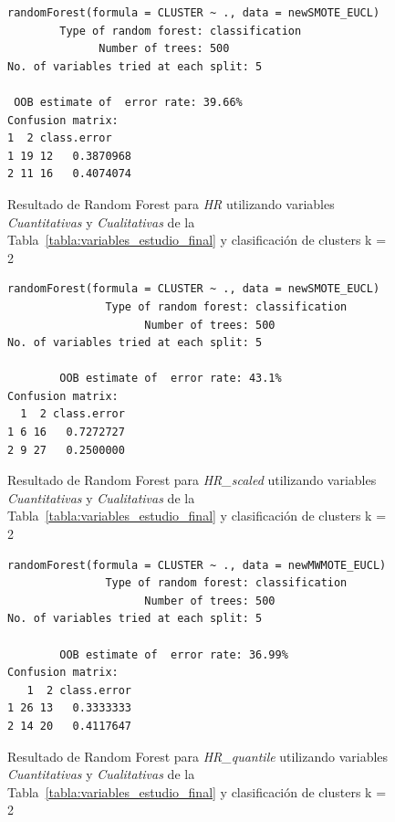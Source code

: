 \begin{figure}[H]
    \centering
    \begin{lstlisting}[frame=single, basicstyle=\small\ttfamily]
        randomForest(formula = CLUSTER ~ ., data = newSMOTE_EUCL) 
        Type of random forest: classification
              Number of trees: 500
No. of variables tried at each split: 5

 OOB estimate of  error rate: 39.66%
Confusion matrix:
1  2 class.error
1 19 12   0.3870968
2 11 16   0.4074074
    \end{lstlisting}
    \caption{Resultado de Random Forest para \textit{HR} utilizando variables \textit{Cuantitativas} y \textit{Cualitativas} de la Tabla~\ref{tabla:variables_estudio_final} y clasificación de clusters k = 2}\label{fig:random_forest_eucl_result_1}
\end{figure}
\begin{figure}[H]
    \centering
    \begin{lstlisting}[frame=single, basicstyle=\small\ttfamily]
        randomForest(formula = CLUSTER ~ ., data = newSMOTE_EUCL) 
               Type of random forest: classification
                     Number of trees: 500
No. of variables tried at each split: 5

        OOB estimate of  error rate: 43.1%
Confusion matrix:
  1  2 class.error
1 6 16   0.7272727
2 9 27   0.2500000
    \end{lstlisting}
    \caption{Resultado de Random Forest para \textit{HR\_scaled} utilizando variables \textit{Cuantitativas} y \textit{Cualitativas} de la Tabla~\ref{tabla:variables_estudio_final} y clasificación de clusters k = 2}
    \label{fig:random_forest_eucl_result_2}
\end{figure}

\begin{figure}[H]
    \centering
    \begin{lstlisting}[frame=single, basicstyle=\small\ttfamily]
        randomForest(formula = CLUSTER ~ ., data = newMWMOTE_EUCL) 
               Type of random forest: classification
                     Number of trees: 500
No. of variables tried at each split: 5

        OOB estimate of  error rate: 36.99%
Confusion matrix:
   1  2 class.error
1 26 13   0.3333333
2 14 20   0.4117647
    \end{lstlisting}
    \caption{Resultado de Random Forest para \textit{HR\_quantile} utilizando variables \textit{Cuantitativas} y \textit{Cualitativas} de la Tabla~\ref{tabla:variables_estudio_final} y clasificación de clusters k = 2}
    \label{fig:random_forest_eucl_result_3}
\end{figure}

